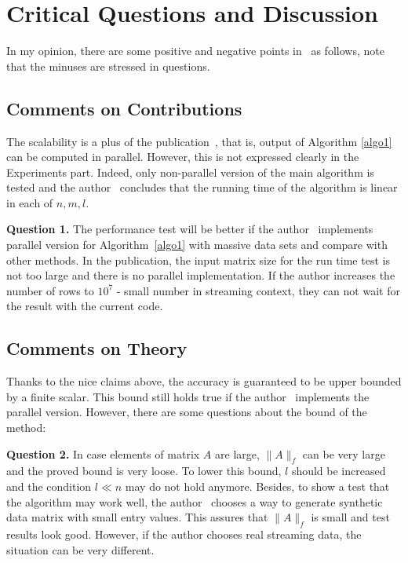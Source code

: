 \documentclass{acm_proc_article-sp}
\begin{document}

\section{Critical Questions and Discussion}
In my opinion, there are some positive and negative points in~\cite{ref1} as follows, note that the minuses are stressed in questions.

\subsection{Comments on Contributions}
The scalability is a plus of the publication~\cite{ref1}, that is, output of Algorithm \ref{algo1} can be computed in parallel. However, this is not expressed clearly in the Experiments part. Indeed, only non-parallel version of the main algorithm is tested and the author~\cite{ref1} concludes that the running time of the algorithm is linear in each of $n, m, l$.

\textbf{Question 1.} The performance test will be better if the author~\cite{ref1} implements parallel version for Algorithm~\ref{algo1} with massive data sets and compare with other methods. In the publication, the input matrix size for the run time test is not too large and there is no parallel implementation. If the author increases the number of rows to $10^7$ - small number in streaming context, they can not wait for the result with the current code.

\subsection{Comments on Theory}
Thanks to the nice claims above, the accuracy is guaranteed to be upper bounded by a finite scalar. This bound still holds true if the author~\cite{ref1} implements the parallel version. However, there are some questions about the bound of the method:

\textbf{Question 2.} In case elements of matrix $A$ are large, $\|A\|_{f}$ can be very large and the proved bound is very loose. To lower this bound, $l$ should be increased and the condition $l \ll n$ may do not hold anymore. Besides, to show a test that the algorithm may work well, the author~\cite{ref1} chooses a way to generate synthetic data matrix with small entry values. This assures that $\|A\|_{f}$ is small and test results look good. However, if the author chooses real streaming data, the situation can be very different.
\end{document}
